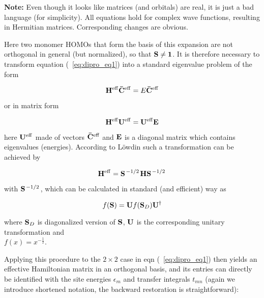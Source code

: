 \textbf{Note:} Even though it looks like matrices (and orbitals) are real,
it is just a bad language (for simplicity). 
All equations hold for complex wave functions, 
resulting in Hermitian matrices. 
Corresponding changes are obvious.

Here two
monomer HOMOs that form the basis of this expansion
are not orthogonal in general (but normalized), 
so that $\mathbf{ S } \neq \mathbf{ 1 }$.
It is therefore necessary to
transform equation (~\ref{eq:dipro_eq1}) into a standard eigenvalue problem
of the form

\begin{equation}
  \mathbf{ H }^{\mathrm{eff}} \mathbf{ \bar{C} }^{\mathrm{eff}} =
  E \mathbf{ \bar{C} }^{\mathrm{eff}}
  \label{eq:dipro_eq7}
\end{equation}

or in matrix form

\begin{equation}
  \mathbf{ H }^\mathrm{eff} \mathbf{ U }^\mathrm{eff} =
  \mathbf{ U }^\mathrm{eff} \mathbf{ E }
  \label{eq:dipro_eq8}
\end{equation}

here $\mathbf{ U }^\mathrm{eff}$ made of vectors $\mathbf{ \bar{C} }^{\mathrm{eff}}$ 
and $\mathbf{ E }$ is a diagonal matrix which contains eigenvalues (energies).
According to L\"owdin such a transformation can be
achieved by

\begin{equation}
  \mathbf{ H^\mathrm{eff} } = \mathbf{ S }^{\left. {-1} \middle/ {2} \right.}
  \mathbf{ H }\mathbf{ S }^{\left. {-1} \middle/ {2} \right.}
  \label{eq:dipro_eq9}
\end{equation}

with $\mathbf{ S }^{\left. {-1} \middle/ {2} \right.}$, 
which can be calculated in standard (and efficient) way as

\begin{equation}
  f(\mathbf{ S }) = \mathbf{ U } f(\mathbf{ S }_D) \mathbf{ U^\dagger }
  \label{eq:dipro_eq10}
\end{equation}

where $\mathbf{ S }_D$ is diagonalized version of $\mathbf{ S }$, $\mathbf{ U }$
is the corresponding unitary transformation and \\
$f(x)=x^{-\frac{1}{2}}$.

Applying this procedure to the $2\times2$ case in
eqn (~\ref{eq:dipro_eq1}) then yields an effective Hamiltonian matrix in
an orthogonal basis, and its entries can directly be
identified with the site energies $\epsilon_m$ 
and transfer integrals $t_{mn}$ (again we introduce
shortened notation, the backward restoration is straightforward):

